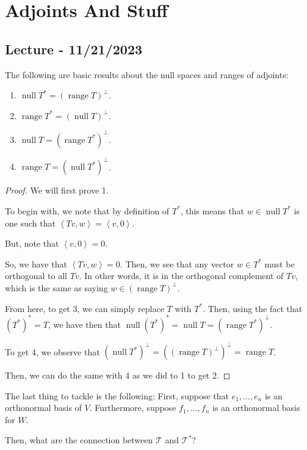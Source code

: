 \documentclass[openany]{book}
\DeclareMathOperator*{\vnull}{null}
\DeclareMathOperator*{\vrange}{range}
\newcommand{\innerproduct}[2]{\left\langle{#1}, {#2}\right\rangle}
\begin{document}
\chapter{Adjoints And Stuff}
\section{Lecture - 11/21/2023}
The following are basic results about the null spaces and ranges of adjoints:
\begin{enumerate}
	\item $\vnull T^{*} = (\vrange T)^{\perp}$.
	\item $\vrange T^{*} = (\vnull T)^{\perp}$.
	\item $\vnull T = (\vrange T^{*})^{\perp}$.
	\item $\vrange T = (\vnull T^{*})^{\perp}$.
\end{enumerate}
\begin{proof}
	We will first prove 1.
	
	To begin with, we note that by definition of $T^{*}$, this means that $w \in \vnull T^{*}$ is one such that $\innerproduct{Tv}{w} = \innerproduct{v}{0}$.
	
	But, note that $\innerproduct{v}{0} = 0$.
	
	So, we have that $\innerproduct{Tv}{w} = 0$. Then, we see that any vector $w \in T^{*}$ must be orthogonal to all $Tv$. In other words, it is in the orthogonal complement of $Tv$, which is the same as saying $w \in (\vrange T)^{\perp}$.
	
	From here, to get 3, we can simply replace $T$ with $T^{*}$. Then, using the fact that $\left( T^{*} \right)^{*} = T$, we have then that $\vnull (T^{*})^{*} = \vnull T = (\vrange T^{*})^{\perp}$.
	
	To get 4, we observe that $(\vnull T^{*})^{\perp} = \left( (\vrange T)^{\perp} \right)^{\perp} = \vrange T$.
	
	Then, we can do the same with 4 as we did to 1 to get 2.
\end{proof}

The last thing to tackle is the following:
First, suppose that $e_{1}, \ldots, e_{n}$ is an orthonormal basis of $V$. Furthermore, suppose $f_{1}, \ldots, f_{n}$ is an orthonormal basis for $W$.

Then, what are the connection between $\mathcal{T}$ and $\mathcal{T^{*}}$?
\end{document}
